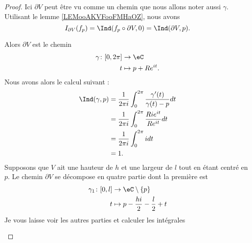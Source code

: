 \begin{proof}
    Ici \( \partial V\) peut être vu comme un chemin que nous allons noter aussi \( \gamma\). Utilisant le lemme \ref{LEMooAKVFooFMHaOZ}, nous avons
    \begin{equation}        \label{EQooRSXRooTJwDNP}
        I_{\partial V}(f_p)=\Ind(f_p\circ\partial V,0)=\Ind(\partial V,p).
    \end{equation}
    
    \begin{subproof}
        Alors \( \partial V\) est le chemin
        \begin{equation}
            \begin{aligned}
                \gamma\colon \mathopen[ 0 , 2\pi \mathclose]&\to \eC \\
                t&\mapsto p+R e^{it}. 
            \end{aligned}
        \end{equation}
        Nous avons alors le calcul suivant :
        \begin{subequations}
            \begin{align}
                \Ind(\gamma,p)&=\frac{1}{ 2\pi i }\int_0^{2\pi}\frac{ \gamma'(t) }{ \gamma(t)-p }dt\\
                &=\frac{1}{ 2\pi i }\int_0^{2\pi}\frac{ Ri e^{it} }{ R e^{it} }dt\\
                &=\frac{1}{ 2\pi i }\int_0^{2\pi}idt\\
                &=1.
            \end{align}
        \end{subequations}
        Supposons que \( V\) ait une hauteur de \( h\) et une largeur de \( l\) tout en étant centré en \( p\). Le chemin \( \partial V\) se décompose en quatre partie dont la première est
        \begin{equation}
            \begin{aligned}
                \gamma_1\colon \mathopen[ 0 , l \mathclose]&\to \eC\setminus \{ p \} \\
                t&\mapsto p-\frac{ hi }{ 2 }-\frac{ l }{2}+t 
            \end{aligned}
        \end{equation}
        Je vous laisse voir les autres parties et calculer les intégrales
        

\end{subproof}
\end{proof}
